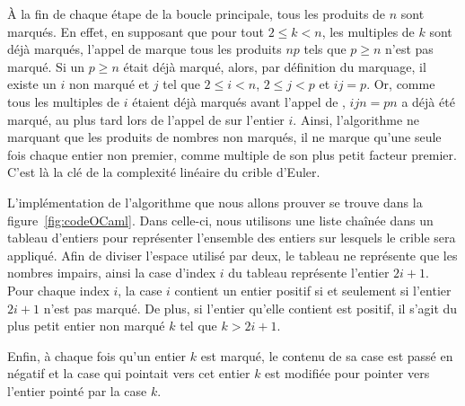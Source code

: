 \documentclass[a4paper]{easychair}
\begin{document}
À la fin de chaque étape de la boucle principale, tous les produits de $n$ sont
marqués. En effet, en supposant que pour tout $2 \leq k < n$, les multiples de $k$
sont déjà marqués, l'appel de  marque tous les produits
$np$ tels que $p \geq n$ n'est pas marqué. Si un $p \geq n$ était déjà marqué,
alors, par définition du marquage, il existe un $i$ non marqué et $j$ tel que
$2 \leq i < n$, $2 \leq j < p$ et $ij = p$. Or, comme tous les multiples de $i$
étaient déjà marqués avant l'appel de , $ijn = pn$
a déjà été marqué, au plus tard lors de l'appel de  sur
l'entier $i$.
Ainsi, l'algorithme ne marquant que les produits de nombres non marqués, il ne
marque qu'une seule fois chaque entier non premier, comme multiple de
son plus petit facteur premier. C'est là la clé de la complexité
linéaire du crible d'Euler.

L'implémentation de l'algorithme que nous allons prouver se trouve dans la
figure~\ref{fig:codeOCaml}. Dans celle-ci, nous utilisons une liste chaînée
dans un tableau d'entiers pour représenter l'ensemble des entiers sur lesquels
le crible sera appliqué.
Afin de diviser l'espace utilisé par deux, le tableau ne représente que les nombres
impairs, ainsi la case d'index $i$ du tableau représente l'entier $2i + 1$.
Pour chaque index $i$, la case $i$ contient un entier positif si et
seulement si l'entier $2i + 1$ n'est pas marqué.
De plus, si l'entier qu'elle contient est positif, il s'agit du plus
petit entier non marqué $k$ tel que $k > 2i + 1$. %

Enfin, à chaque fois qu'un entier $k$ est marqué, le contenu de sa case est passé
en négatif et la case qui pointait vers cet entier $k$ est modifiée pour pointer
vers l'entier pointé par la case $k$.
\end{document}
